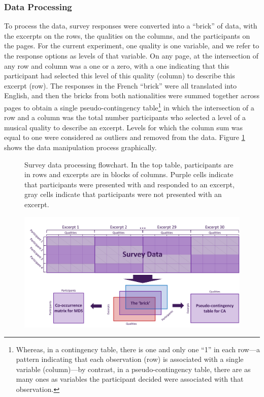 \documentclass[
  english,
  man,floatsintext]{apa6}
\begin{document}
\hypertarget{data-processing}{%
\subsubsection{Data Processing}\label{data-processing}}

To process the data, survey responses were converted into a ``brick'' of data, with the excerpts on the rows, the qualities on the columns, and the participants on the pages. For the current experiment, one quality is one variable, and we refer to the response options as levels of that variable. On any page, at the intersection of any row and column was a one or a zero, with a one indicating that this participant had selected this level of this quality (column) to describe this excerpt (row). The responses in the French ``brick'' were all translated into English, and then the bricks from both nationalities were summed together across pages to obtain a single pseudo-contingency table\footnote{Whereas, in a contingency table, there is one and only one ``1'' in each row---a pattern indicating that each observation (row) is associated with a single variable (column)---by contrast, in a pseudo-contingency table, there are as many ones as variables the participant decided were associated with that observation.} in which the intersection of a row and a column was the total number participants who selected a level of a musical quality to describe an excerpt. Levels for which the column sum was equal to one were considered as outliers and removed from the data. Figure \ref{fig:dataflow} shows the data manipulation process graphically.

\begin{figure}   
  \centering  
  \caption{Survey data processing flowchart. In the top table, participants are in rows and excerpts are in blocks of columns. Purple cells indicate that participants were presented with and responded to an excerpt, gray cells indicate that participants were not presented with an excerpt.}
    \includegraphics[width=1\columnwidth]{./Music-Descriptor-Space_files/figure-latex/dataflow.png}
  \label{fig:dataflow}
  \caption*{\footnotesize }
\end{figure}
\end{document}
